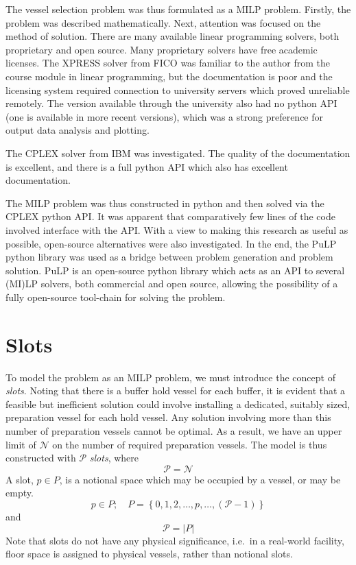 The vessel selection problem was thus formulated as a MILP problem.
Firstly, the problem was described mathematically.
Next, attention was focused on the method of solution.
There are many available linear programming solvers, both proprietary and open
source.
Many proprietary solvers have free academic licenses.
The XPRESS solver from FICO was familiar to the author from the course module
in linear programming, but the documentation is poor and the licensing system
required connection to university servers which proved unreliable remotely.
The version available through the university also had no python API (one is
available in more recent versions), which was a strong preference for output
data analysis and plotting.

The CPLEX solver from IBM was investigated.
The quality of the documentation is excellent, and there is a full python API
which also has excellent documentation.

The MILP problem was thus constructed in python and then solved via the CPLEX
python API.
It was apparent that comparatively few lines of the code involved interface
with the API.
With a view to making this research as useful as possible, open-source
alternatives were also investigated.
In the end, the PuLP python library was used as a bridge between problem
generation and problem solution.
PuLP is an open-source python library which acts as an API to several
(MI)LP solvers, both commercial and open source, allowing the possibility of a
fully open-source tool-chain for solving the problem.

\section{Slots}\label{S.slots}

To model the problem as an MILP problem, we must introduce the concept of
\emph{slots}.
Noting that there is a buffer hold vessel for each buffer, it is evident that
a feasible but inefficient solution could involve installing a dedicated,
suitably sized, preparation vessel for each hold vessel.
Any solution involving more than this number of preparation vessels cannot
be optimal.
As a result, we have an upper limit of $\mathcal{N}$ on the number of required
preparation vessels.
The model is thus constructed with $\mathcal{P}$ \emph{slots}, where
\begin{equation}
    \mathcal{P} = \mathcal{N}
\end{equation}
A slot, $p \in P$, is a notional space which may be occupied by a vessel, or
may be empty.
\begin{equation}
    p \in P; \quad P = \left\{ 0, 1, 2, \ldots, p, \ldots, \left( 
    \mathcal{P} - 1 \right) \right\}
\end{equation}
and
\begin{equation}
    \mathcal{P} = |P|
\end{equation}
Note that slots do not have any physical significance, i.e.\ in a real-world
facility, floor space is assigned to physical vessels, rather than notional
slots.

